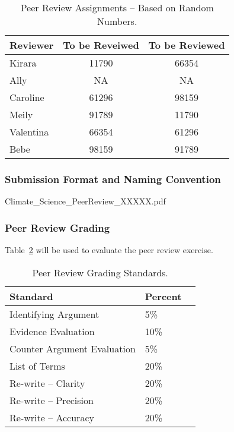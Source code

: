 \begin{table}[h]
\caption{Peer Review Assignments -- Based on Random Numbers.}
\label{tab:peerreviewassignments}
\begin{tabular}{lcc}\hline
Reviewer    &   To be Reveiwed   & To be Reviewed\\ 
\hline\hline
Kirara      & 11790   & 66354\\
Ally        &   NA    & NA \\
Caroline    & 61296   & 98159 \\
Meily       & 91789   & 11790 \\
Valentina   & 66354   & 61296 \\
Bebe        & 98159   & 91789 \\
\hline
\end{tabular}
\end{table}

\subsubsection{Submission Format and Naming Convention}

Climate\_Science\_PeerReview\_XXXXX.pdf

\subsubsection{Peer Review Grading}

Table~\ref{tab:peerreviewgrading} will be used to evaluate the peer review exercise. 

\begin{table}[h]
\caption{Peer Review Grading Standards.}
\label{tab:peerreviewgrading}
\begin{tabular}{lll}\hline
Standard                      &   Percent   & \\ 
\hline\hline
Identifying Argument          &   5\%      & \\
Evidence Evaluation           &   10\%      & \\
Counter Argument Evaluation & 5\%    & \\
List of Terms               & 20\%    & \\
Re-write -- Clarity         & 20\%    & \\
Re-write -- Precision       & 20\%    & \\
Re-write -- Accuracy        & 20\%    & \\

\hline
\end{tabular}
\end{table}

